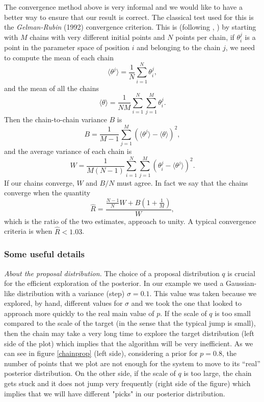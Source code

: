 \documentclass[onecolumn,           %
               showpacs,            %
               preprintnumbers,     %
               aps,                 %
               prl,          	    %
               letterpaper,             %
               superscriptaddress,      %
               nofootinbib,         %
               tightenlines,        %
               floats,floatfix      %
               ,usenatbib,
               ]{revtex4-1}
\begin{document}
The convergence method above is very informal and we would like to have a better way to ensure that our result is correct. The classical test used for this is the \textit{Gelman-Rubin} (1992) convergence criterion. This is (following \cite{LicV2}, \cite{AlanH}) by starting with $M$ chains with very different initial points and $N$ points per chain, if $\theta_i^j$ is a point in the parameter space of position $i$ and belonging to the chain $j$, we need to compute the mean of each chain 
\begin{equation}
\langle\theta^j\rangle =\frac{1}{N}\sum_{i=1}^N \theta_i^j,
\end{equation}
and the mean of all the chains
\begin{equation}
\langle\theta\rangle =\frac{1}{NM}\sum_{i=1}^N\sum_{j=1}^M\theta_i^j.
\end{equation}
Then the chain-to-chain variance $B$ is
\begin{equation}
B=\frac{1}{M-1}\sum_{j=1}^M(\langle\theta^j\rangle-\langle\theta\rangle)^2 ,
\end{equation}
and the average variance of each chain is
\begin{equation}
W=\frac{1}{M(N-1)}\sum_{i=1}^N\sum_{j=1}^M(\theta_i^j-\langle\theta^j\rangle)^2 .
\end{equation}
If our chains converge, $W$ and $B/N$ must agree. In fact we say that the chains converge when the quantity
\begin{equation}
\hat R=\frac{\frac{N-1}{N}W+B(1+\frac{1}{M})}{W},
\end{equation}
which is the ratio of the two estimates, approach to unity. A typical convergence criteria is when $\hat R<1.03$. 

\subsubsection{Some useful details}

\textit{About the proposal distribution.} The choice of a proposal distribution $q$ is crucial for the efficient exploration of the posterior. In our example we used a Gaussian-like distribution with a variance (step) $\sigma=0.1$. This value was taken because we explored, by hand, different values for $\sigma$ and we took the one that looked to approach more quickly to the real main value of $p$. If the scale of $q$ is too small compared to the scale of the target (in the sense that the typical jump is small), then the chain may take a very long time to explore the target distribution (left side of the plot) which implies that the algorithm will be very inefficient. As we can see in figure \ref{chainprop} (left side), considering a prior for $p=0.8$, the number of points that we plot are not enough for the system to move to its ``real'' posterior distribution. On the other side, if the scale of $q$ is too large, the chain gets stuck and it does not jump very frequently (right side of the figure) which implies that we will have different "picks" in our posterior distribution.    
\end{document}
